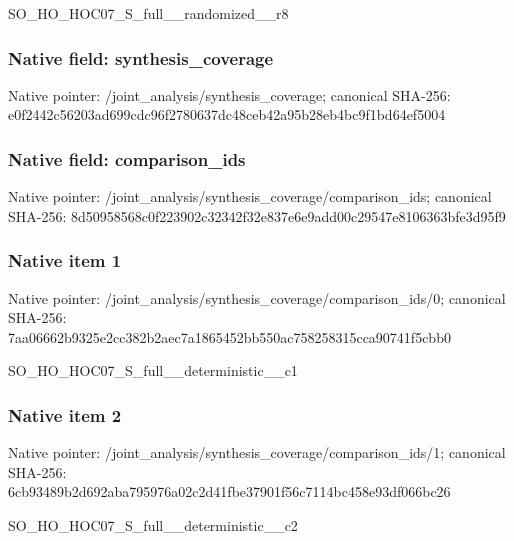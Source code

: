 \documentclass[10pt,a4paper]{article}
\begin{document}
\begingroup\raggedright\sloppy SO\_\allowbreak{}HO\_\allowbreak{}HOC07\_\allowbreak{}S\_\allowbreak{}full\_\allowbreak{}\_\allowbreak{}randomized\_\allowbreak{}\_\allowbreak{}r8\par\endgroup

\subsubsection{Native field: synthesis\_\allowbreak{}coverage}
Native pointer: /joint\_\allowbreak{}analysis/synthesis\_\allowbreak{}coverage; canonical SHA-256: e0f2442c56203ad699cdc96f2780637dc48ceb42a95b28eb4bc9f1bd64ef5004

\subsubsection{Native field: comparison\_\allowbreak{}ids}
Native pointer: /joint\_\allowbreak{}analysis/synthesis\_\allowbreak{}coverage/comparison\_\allowbreak{}ids; canonical SHA-256: 8d50958568c0f223902c32342f32e837e6e9add00c29547e8106363bfe3d95f9

\subsubsection{Native item 1}
Native pointer: /joint\_\allowbreak{}analysis/synthesis\_\allowbreak{}coverage/comparison\_\allowbreak{}ids/0; canonical SHA-256: 7aa06662b9325e2cc382b2aec7a1865452bb550ac758258315cca90741f5cbb0

\begingroup\raggedright\sloppy SO\_\allowbreak{}HO\_\allowbreak{}HOC07\_\allowbreak{}S\_\allowbreak{}full\_\allowbreak{}\_\allowbreak{}deterministic\_\allowbreak{}\_\allowbreak{}c1\par\endgroup

\subsubsection{Native item 2}
Native pointer: /joint\_\allowbreak{}analysis/synthesis\_\allowbreak{}coverage/comparison\_\allowbreak{}ids/1; canonical SHA-256: 6cb93489b2d692aba795976a02c2d41fbe37901f56c7114bc458e93df066bc26

\begingroup\raggedright\sloppy SO\_\allowbreak{}HO\_\allowbreak{}HOC07\_\allowbreak{}S\_\allowbreak{}full\_\allowbreak{}\_\allowbreak{}deterministic\_\allowbreak{}\_\allowbreak{}c2\par\endgroup
\end{document}
